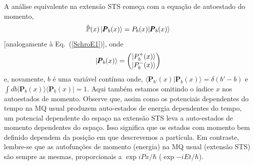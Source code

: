 A análise equivalente na extensão STS começa com a equação de autoestado do momento,
\begin{equation}\label{SchroTP1}
\hat{\mathbb P}(x) \ket{\pmb{P}_b(x)}= P_b(x)|\pmb{P}_b(x)\rangle
\end{equation}
[analogamente à Eq.~(\ref{SchroE1})], onde
\begin{equation}\label{Pb}
\ket{\pmb{P}_b(x)}=\mqty(|P^+_b(x)\rangle   \\ |P^-_b(x)\rangle)
\end{equation}
e, novamente, $b$ é uma variável contínua onde, ${\langle} \pmb{P}_{b'}(x)|\pmb{P}_b(x)\rangle=\delta(b'-b)$ e $\int db |\pmb{P}_b(x)\rangle{\langle} \pmb{P}_b(x)|=1$. Aqui também estamos omitindo o índice $x$ nos autoestados de momento. Observe que, assim como os potenciais dependentes do tempo na MQ usual produzem auto-estados de energia dependentes do tempo, um potencial dependente do espaço na extensão STS leva a auto-estados de momento dependentes do espaço. Isso significa que os estados com momento bem definido dependem da posição em que descrevemos a partícula. Em contraste, lembre-se que as autofunções de momento (energia) na MQ usual (extensão STS) são sempre as mesmas, proporcionais a $\exp{iPx/\hbar}$ ($\exp{-iEt/\hbar}$).


